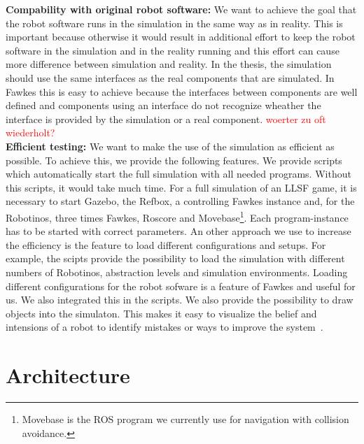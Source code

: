 \textbf{Compability with original robot software:} We want to achieve the goal that the robot software runs in the simulation in the same way as in reality. This is important because otherwise it would result in additional effort to keep the robot software in the simulation and in the reality running and this effort can cause more difference between simulation and reality. In the thesis, the simulation should use the same interfaces as the real components that are simulated. In Fawkes this is easy to achieve because the interfaces between components are well defined and components using an interface do not recognize wheather the interface is provided by the simulation or a real component. \textcolor{red}{woerter zu oft wiederholt?}\\
\textbf{Efficient testing:} We want to make the use of the simulation as efficient as possible. To achieve this, we provide the following features. We provide scripts which automatically start the full simulation with all needed programs. Without this scripts, it would take much time. For a full simulation of an LLSF game, it is necessary to start Gazebo, the Refbox, a controlling Fawkes instance and, for the Robotinos, three times Fawkes, Roscore and Movebase\footnote{Movebase is the ROS program we currently use for navigation with collision avoidance.}. Each program-instance has to be started with correct parameters.  An other approach we use to increase the efficiency is the feature to load different configurations and setups. For example, the scipts provide the possibility to load the simulation with different numbers of Robotinos, abstraction levels and simulation environments. Loading different configurations for the robot sofware is a feature of Fawkes and useful for us. We also integrated this in the scripts. We also provide the possibility to draw objects into the simulaton. This makes it easy to visualize the belief and intensions of a robot to identify mistakes or ways to improve the system~\cite{Visualization}.



\section{Architecture}
